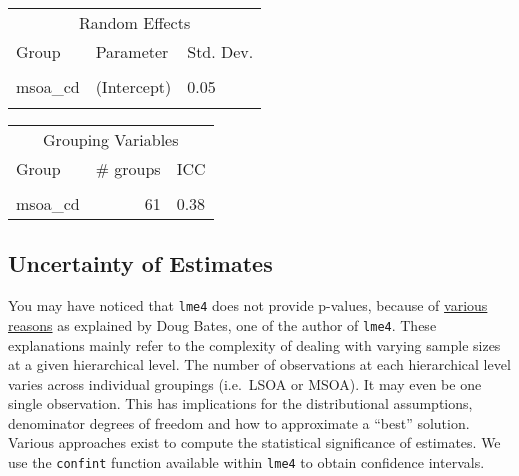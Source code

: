 \documentclass[
  letterpaper,
  krantz2]{style/krantz}
\begin{document}
\begin{table}[!h]
\begin{threeparttable}
\end{threeparttable}
\end{table} \begin{table}[!h]
\centering
\begin{tabular}{lll}
\toprule
\multicolumn{3}{c}{Random Effects} \\
\cmidrule(l{3pt}r{3pt}){1-3}
Group & Parameter & Std. Dev.\\
\midrule
\cellcolor{gray!6}{lsoa\_cd} & \cellcolor{gray!6}{(Intercept)} & \cellcolor{gray!6}{0.03}\\
msoa\_cd & (Intercept) & 0.05\\
\cellcolor{gray!6}{Residual} & \cellcolor{gray!6}{} & \cellcolor{gray!6}{0.05}\\
\bottomrule
\end{tabular}
\end{table} \begin{table}[!h]
\centering
\begin{tabular}{lrl}
\toprule
\multicolumn{3}{c}{Grouping Variables} \\
\cmidrule(l{3pt}r{3pt}){1-3}
Group & \# groups & ICC\\
\midrule
\cellcolor{gray!6}{lsoa\_cd} & \cellcolor{gray!6}{298} & \cellcolor{gray!6}{0.14}\\
msoa\_cd & 61 & 0.38\\
\bottomrule
\end{tabular}
\end{table}

\hypertarget{uncertainty-of-estimates}{%
\subsection{Uncertainty of Estimates}\label{uncertainty-of-estimates}}

You may have noticed that \texttt{lme4} does not provide p-values,
because of
\href{https://stat.ethz.ch/pipermail/r-help/2006-May/094765.html}{various
reasons} as explained by Doug Bates, one of the author of \texttt{lme4}.
These explanations mainly refer to the complexity of dealing with
varying sample sizes at a given hierarchical level. The number of
observations at each hierarchical level varies across individual
groupings (i.e.~LSOA or MSOA). It may even be one single observation.
This has implications for the distributional assumptions, denominator
degrees of freedom and how to approximate a ``best'' solution. Various
approaches exist to compute the statistical significance of estimates.
We use the \texttt{confint} function available within \texttt{lme4} to
obtain confidence intervals.
\end{document}
